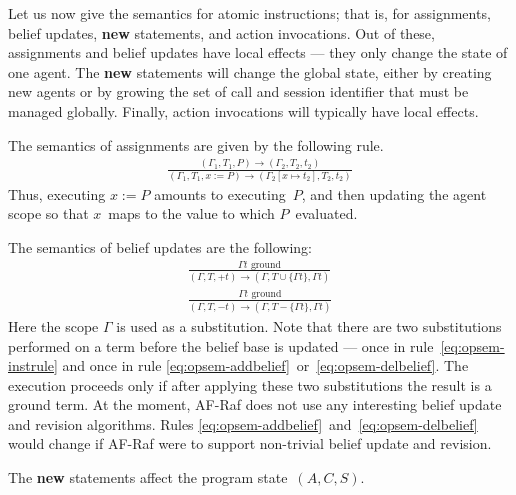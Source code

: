 \documentclass[a4paper,12pt,oneside,fleqn]{book} %
\begin{document}
Let us now give the semantics for atomic instructions; that is, for
assignments, belief updates, {\bf new} statements, and action invocations.
Out of these, assignments and belief updates have local effects --- they
only change the state of one agent. The {\bf new} statements will change
the global state, either by creating new agents or by growing the set of
call and session identifier that must be managed globally. Finally, action
invocations will typically have local effects.

The semantics of assignments are given by the following rule.
\begin{align}
\frac
  {(\Gamma_1,T_1,P)\to(\Gamma_2,T_2,t_2)}
  {(\Gamma_1,T_1,x:=P)\to(\Gamma_2[x\mapsto t_2],T_2,t_2)}
\end{align}
Thus, executing $x:=P$ amounts to executing~$P$, and then updating the
agent scope so that $x$~maps to the value to which $P$~evaluated.

The semantics of belief updates are the following:
\begin{align}
\frac
  {\text{$\Gamma t$ ground}}
  {(\Gamma,T,+t)\to(\Gamma,T\cup\{\Gamma t\},\Gamma t)}
  \label{eq:opsem-addbelief}
\\[1ex]
\frac
  {\text{$\Gamma t$ ground}}
  {(\Gamma,T,-t)\to(\Gamma,T-\{\Gamma t\},\Gamma t)}
  \label{eq:opsem-delbelief}
\end{align}
Here the scope $\Gamma$ is used as a substitution. Note that there are two
substitutions performed on a term before the belief base is updated ---
once in rule~\eqref{eq:opsem-instrule} and once in rule
\eqref{eq:opsem-addbelief}~or~\eqref{eq:opsem-delbelief}. The execution
proceeds only if after applying these two substitutions the result is a
ground term. At the moment, AF-Raf does not use any interesting belief
update and revision algorithms. Rules
\eqref{eq:opsem-addbelief}~and~\eqref{eq:opsem-delbelief} would change if
AF-Raf were to support non-trivial belief update and revision.

The {\bf new} statements affect the program state~$(A,C,S)$.
\end{document}
